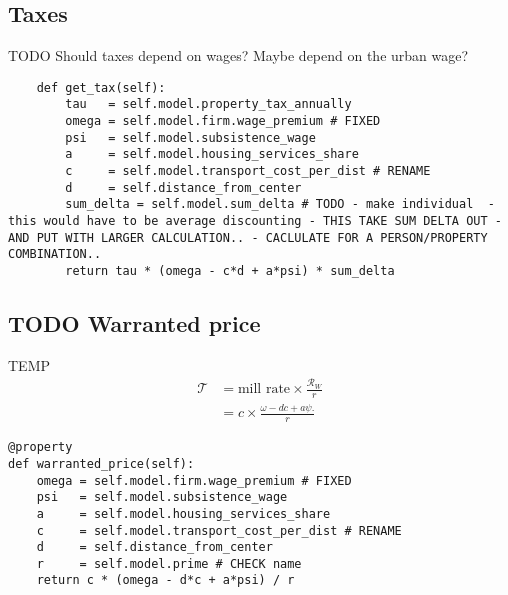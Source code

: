 {\subsection{Taxes}
TODO Should taxes depend on wages? Maybe depend on the urban wage?


        
\begin{lstlisting}
    def get_tax(self):
        tau   = self.model.property_tax_annually
        omega = self.model.firm.wage_premium # FIXED
        psi   = self.model.subsistence_wage
        a     = self.model.housing_services_share
        c     = self.model.transport_cost_per_dist # RENAME
        d     = self.distance_from_center
        sum_delta = self.model.sum_delta # TODO - make individual  - this would have to be average discounting - THIS TAKE SUM DELTA OUT - AND PUT WITH LARGER CALCULATION.. - CACLULATE FOR A PERSON/PROPERTY COMBINATION..
        return tau * (omega - c*d + a*psi) * sum_delta
\end{lstlisting}


\subsection{TODO Warranted price}

TEMP
\begin{align*}
\mathcal{T} &= \text{mill rate} \times \frac{\mathcal{R}_W}{r} \\
&= c \times \frac{\omega- {dc} + a\psi.}{r}
\end{align*}

\begin{lstlisting}
@property
def warranted_price(self):
    omega = self.model.firm.wage_premium # FIXED
    psi   = self.model.subsistence_wage
    a     = self.model.housing_services_share
    c     = self.model.transport_cost_per_dist # RENAME
    d     = self.distance_from_center
    r     = self.model.prime # CHECK name
    return c * (omega - d*c + a*psi) / r
    

\end{lstlisting}}
